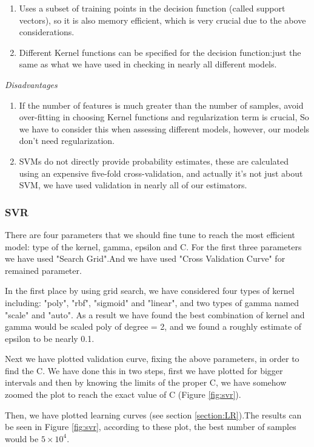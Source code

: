 \documentclass[a4paper,12pt]{article}
\begin{document}
\begin{multicols}{2}
\begin{enumerate}
\item
Uses a subset of training points in the decision function (called support vectors), so it is also memory efficient, which is very crucial due to the above considerations.

\item
Different Kernel functions can be specified for the decision function:just the same as what we have used in checking in nearly all different models.
\end{enumerate}

\emph{Disadvantages}
\begin{enumerate}
\item 
If the number of features is much greater than the number of samples, avoid over-fitting in choosing Kernel functions and regularization term is crucial, So we have to consider this when assessing different models, however, our models don't need regularization. 

\item
SVMs do not directly provide probability estimates, these are calculated using an expensive five-fold cross-validation, and actually it's not just about SVM, we have used validation in nearly all of our estimators.
\end{enumerate}

\subsubsection{SVR}
\label{section:SVR}
There are four parameters that we should fine tune to reach the most efficient model: type of the kernel, gamma, epsilon and C. For the first three parameters we have used "Search Grid".And we have used "Cross Validation Curve" for remained parameter.

In the first place by using grid search, we have considered four types of kernel including: "poly", "rbf", "sigmoid" and "linear", and two types of gamma named "scale" and "auto".
As a result we have found the best combination of kernel and gamma would be scaled poly of degree = 2, and we found a roughly estimate  of epsilon to be nearly 0.1.

Next we have plotted validation curve, fixing the above parameters, in order to find the C. We have done this in two steps, first we have plotted for bigger intervals and then by knowing the limits of the proper C, we have somehow zoomed the plot to reach the exact value of C (Figure \ref{fig:svr}).

Then, we have plotted learning curves (see section \ref{section:LR}).The results can be seen in Figure \ref{fig:svr}, according to these plot, the best number of samples would be $5\times10^4$.


\end{multicols}
\end{document}
